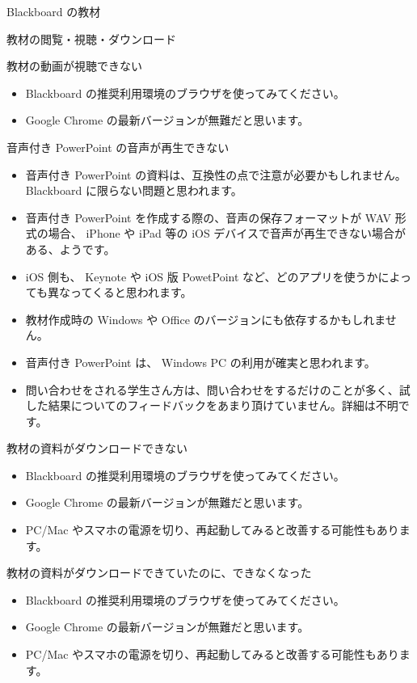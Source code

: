 \documentclass[a4j,10pt]{jsarticle}
\def\lthtmlcheckvsize{\ifdim\ht\sizebox<\vsize 
  \ifdim\wd\sizebox<\hsize\expandafter\hfill\fi \expandafter\vfill
  \else\expandafter\vss\fi}%
\begin{document}
{\newpage\clearpage
{}%
\begin{frame}[label={sec:orgc0f02f7},fragile]{Blackboard の教材}
\begin{block}{教材の閲覧・視聴・ダウンロード}
\begin{block}{教材の動画が視聴できない}
\begin{itemize}
\item Blackboard の推奨利用環境のブラウザを使ってみてください。
\item Google Chrome の最新バージョンが無難だと思います。
\end{itemize}
\end{block}
\par
\begin{block}{音声付き PowerPoint の音声が再生できない}
\begin{itemize}
\item 音声付き PowerPoint の資料は、互換性の点で注意が必要かもしれません。 Blackboard に限らない問題と思われます。
\item 音声付き PowerPoint を作成する際の、音声の保存フォーマットが WAV 形式の場合、 iPhone や iPad 等の iOS デバイスで音声が再生できない場合がある、ようです。
\item iOS 側も、 Keynote や iOS 版 PowetPoint など、どのアプリを使うかによっても異なってくると思われます。
\item 教材作成時の Windows や Office のバージョンにも依存するかもしれません。
\item 音声付き PowerPoint は、 Windows PC の利用が確実と思われます。
\item 問い合わせをされる学生さん方は、問い合わせをするだけのことが多く、試した結果についてのフィードバックをあまり頂けていません。詳細は不明です。
\end{itemize}
\end{block}
\par
\begin{block}{教材の資料がダウンロードできない}
\begin{itemize}
\item Blackboard の推奨利用環境のブラウザを使ってみてください。
\item Google Chrome の最新バージョンが無難だと思います。
\item PC/Mac やスマホの電源を切り、再起動してみると改善する可能性もあります。
\end{itemize}
\end{block}
\par
\begin{block}{教材の資料がダウンロードできていたのに、できなくなった}
\begin{itemize}
\item Blackboard の推奨利用環境のブラウザを使ってみてください。
\item Google Chrome の最新バージョンが無難だと思います。
\item PC/Mac やスマホの電源を切り、再起動してみると改善する可能性もあります。
\end{itemize}
\end{block}
\end{block}
\end{frame}%
\lthtmlfigureZ
\lthtmlcheckvsize\clearpage}
\end{document}
